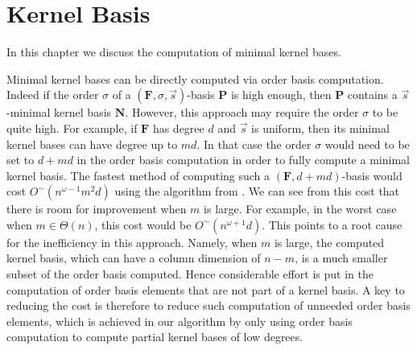 
\chapter{Kernel Basis\label{chap:NullspaceBasis}}

In this chapter we discuss the computation of minimal kernel bases.

Minimal kernel bases can be directly computed via order basis computation.
Indeed if the order $\sigma$ of a $\left(\mathbf{F},\sigma,\vec{s}\right)$-basis
$\mathbf{P}$ is high enough, then $\mathbf{P}$ contains a $\vec{s}$-minimal
kernel basis $\mathbf{N}$. However, this approach may require the
order $\sigma$ to be quite high. For example, if $\mathbf{F}$ has
degree $d$ and $\vec{s}$ is uniform, then its minimal kernel bases
can have degree up to $md$. In that case the order $\sigma$ would
need to be set to $d+md$ in the order basis computation in order
to fully compute a minimal kernel basis. The fastest method of computing
such a $\left(\mathbf{F},d+md\right)$-basis would cost $O^{\sim}\left(n^{\omega-1}m^{2}d\right)$
using the algorithm from \citep{za2009}. We can see from this cost
that there is room for improvement when $m$ is large. For example,
in the worst case when $m\in\Theta\left(n\right)$, this cost would
be $O^{\sim}\left(n^{\omega+1}d\right)$. This points to a root cause
for the inefficiency in this approach. Namely, when $m$ is large,
the computed kernel basis, which can have a column dimension of $n-m$,
is a much smaller subset of the order basis computed. Hence considerable
effort is put in the computation of order basis elements that are
not part of a kernel basis. A key to reducing the cost is therefore
to reduce such computation of unneeded order basis elements, which
is achieved in our algorithm by only using order basis computation
to compute partial kernel bases of low degrees.


